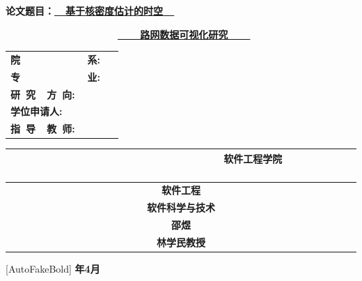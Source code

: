 \vspace{0.5cm}

\begin{center}

	{\yihao \bf {论文题目：\underline{~~基于核密度估计的时空~~}}}

	\vspace{0.8cm}

	{\yihao \bf {\ \ \ \ \ \ \ \ \ \ \ \ \ \ \ \ \ \ \ \ \underline{~~~~路网数据可视化研究~~~~}}}
\end{center}

\vspace{1.6cm}

\begin{center}
	\renewcommand\arraystretch{1.7}
	\begin{tabular}{l}
		{\sihao \bf 院~~~~~~~~~~~~系:} \\
		{\sihao \bf 专~~~~~~~~~~~~业:} \ \      \\
		{\sihao \bf 研~究~~方~向:} \ \     \\
		{\sihao \bf 学位申请人:} \ \      \\
		{\sihao \bf 指~导~~教~师:}
	\end{tabular}
	\begin{tabular}{c}

		{\sihao \bf  ~~~~~~~~~~~~~~~~~~~~~~~~~ 软件工程学院 ~~~~~~~~~~~~~~~~~~~~~~~~~ } \\
		\hline {\sihao \bf 软件工程}                  \\
		\hline {\sihao \bf 软件科学与技术}                 \\
		\hline {\sihao \bf 邵煜}                     \\
		\hline {\sihao \bf 林学民教授}                     \\


		\hline
	\end{tabular}
\end{center}

\vspace{1cm}

\begin{center}
	[AutoFakeBold]
	{\fontsize{14pt}{21pt}\selectfont \bf {}年{4}月}
\end{center}

\cleardoublepage
